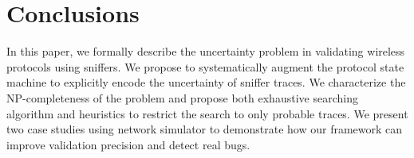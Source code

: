 \section{Conclusions}
\label{sec:conclusion}

In this paper, we formally describe the uncertainty problem in validating
wireless protocols using sniffers. We propose to systematically augment the
protocol state machine to explicitly encode the uncertainty of sniffer traces.
We characterize the NP-completeness of the problem and propose both exhaustive
searching algorithm and heuristics to restrict the search to only probable
traces. We present two case studies using \ns{} network simulator to demonstrate
how our framework can improve validation precision and detect real bugs.

\begin{comment}
Finally, we discuss a few challenges and future
directions.

\textbf{Verification Coverage.} Given a single sniffer trace, it is possible
that not all the states in the state machine are visited during the verification
process. For instance, a rate control state machine based on certain consecutive
packet losses patterns can not be verified if no such consecutive losses appear
in the sniffer trace. In general, given a protocol state machine, how to extract
the packet patterns for each state to be reached and how to alter the testing
such that such patterns can be observed?

\textbf{State Machine Generation.} We manually translated the protocols studied
in this paper into monitor state machines based on the source code, comments and
documentation. The process is time-consuming and error-prone. A more scalable
approach would be taking the protocol specification written in certain formal
language, and automatically translate such specification into state machines
that can be used for verification process.

\end{comment}

